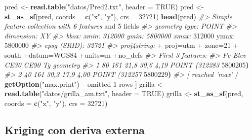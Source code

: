 \documentclass[11pt,b5paper,]{krantz}
\newenvironment{Shaded}{}{}
\newcommand{\CommentTok}[1]{\textcolor[rgb]{0.38,0.63,0.69}{\textit{#1}}}
\newcommand{\DataTypeTok}[1]{\textcolor[rgb]{0.56,0.13,0.00}{#1}}
\newcommand{\DecValTok}[1]{\textcolor[rgb]{0.25,0.63,0.44}{#1}}
\newcommand{\ErrorTok}[1]{\textcolor[rgb]{1.00,0.00,0.00}{\textbf{#1}}}
\newcommand{\KeywordTok}[1]{\textcolor[rgb]{0.00,0.44,0.13}{\textbf{#1}}}
\newcommand{\NormalTok}[1]{#1}
\newcommand{\OperatorTok}[1]{\textcolor[rgb]{0.40,0.40,0.40}{#1}}
\newcommand{\OtherTok}[1]{\textcolor[rgb]{0.00,0.44,0.13}{#1}}
\newcommand{\StringTok}[1]{\textcolor[rgb]{0.25,0.44,0.63}{#1}}
\begin{document}
\begin{Shaded}
\begin{Highlighting}[]
\NormalTok{pred <-}\StringTok{ }\KeywordTok{read.table}\NormalTok{(}\StringTok{"datos/Pred2.txt"}\NormalTok{, }
                   \DataTypeTok{header =} \OtherTok{TRUE}\NormalTok{)}
\NormalTok{pred <-}\StringTok{ }\KeywordTok{st_as_sf}\NormalTok{(pred, }\DataTypeTok{coords =} \KeywordTok{c}\NormalTok{(}\StringTok{"x"}\NormalTok{, }\StringTok{"y"}\NormalTok{), }
                 \DataTypeTok{crs =} \DecValTok{32721}\NormalTok{)}
\KeywordTok{head}\NormalTok{(pred)}
\CommentTok{#> Simple feature collection with 6 features}
\NormalTok{and }\DecValTok{5}\NormalTok{ fields}
\CommentTok{#> geometry type: POINT}
\CommentTok{#> dimension: XY}
\CommentTok{#> bbox: xmin: 312000 ymin: 5800000 xmax:}
\DecValTok{312000}\NormalTok{ ymax}\OperatorTok{:}\StringTok{ }\DecValTok{5800000}
\CommentTok{#> epsg (SRID): 32721}
\CommentTok{#> proj4string: }
    \OperatorTok{+}\StringTok{ }\NormalTok{proj=utm }
    \OperatorTok{+}\StringTok{ }\NormalTok{zone=}\DecValTok{21} 
    \OperatorTok{+}\StringTok{ }\NormalTok{south}
\OperatorTok{+}\NormalTok{datum=WGS84 }\OperatorTok{+}\NormalTok{units=m }\OperatorTok{+}\NormalTok{no_defs}
\CommentTok{#> First 3 features:}
\CommentTok{#> Pe Elev CE30 CE90 Tg geometry}
\CommentTok{#> 1 80 161 21,8 30,6 4,19 POINT (312283}
\DecValTok{5800205}\ErrorTok{)}
\CommentTok{#> 2 40 161 30,3 17,9 4,00 POINT (312257}
\DecValTok{5800229}\ErrorTok{)}
\CommentTok{#> [ reached 'max'}
    \OperatorTok{/}\StringTok{ }\KeywordTok{getOption}\NormalTok{(}\StringTok{"max.print"}\NormalTok{) }\OperatorTok{--}
\NormalTok{omitted }\DecValTok{1}\NormalTok{ rows ]}
\NormalTok{grilla <-}\StringTok{ }\KeywordTok{read.table}\NormalTok{(}\StringTok{"datos/grilla_am.txt"}\NormalTok{, }
                     \DataTypeTok{header =} \OtherTok{TRUE}\NormalTok{)}
\NormalTok{grilla <-}\StringTok{ }\KeywordTok{st_as_sf}\NormalTok{(pred, }\DataTypeTok{coords =} \KeywordTok{c}\NormalTok{(}\StringTok{"x"}\NormalTok{, }\StringTok{"y"}\NormalTok{), }
                   \DataTypeTok{crs =} \DecValTok{32721}\NormalTok{)}
\end{Highlighting}
\end{Shaded}

\hypertarget{kriging-con-deriva-externa}{%
\subsection{Kriging con deriva externa}\label{kriging-con-deriva-externa}}
\end{document}
